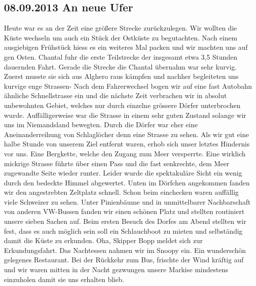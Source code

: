 \subsection{08.09.2013 An neue Ufer} 
Heute war es an der Zeit eine größere Strecke zurückzulegen.
Wir wollten die Küste wechseln um auch ein Stück der Ostküste zu begutachten.
Nach einem ausgiebigen Frühstück hiess es ein weiteres Mal packen und wir machten uns auf gen Osten.
Chantal fuhr die erste Teilstrecke der insgesamt etwa 3,5 Stunden dauernden Fahrt.
Gerade die Strecke die Chantal übernahm war sehr kurvig.
Zuerst musste sie sich aus Alghero raus kämpfen und nachher begleiteten uns kurvige enge Strassen- Nach dem Fahrerwechsel bogen wir auf eine fast Autobahn ähnliche Schnellstrasse ein und die nächste Zeit verbrachen wir in absolut unbewohnten Gebiet, welches nur durch einzelne grössere Dörfer unterbrochen wurde.
Auffälligerweise war die Strasse in einem sehr guten Zustand solange wir uns im Niemandsland bewegten.
Durch die Dörfer war eher eine Aneinanderreihung von Schlaglöcher denn eine Strasse zu sehen.
Als wir gut eine halbe Stunde von unserem Ziel entfernt waren, erhob sich unser letztes Hindernis vor uns.
Eine Bergkette, welche den Zugang zum Meer versperrte.
Eine wirklich mickrige Strasse führte über einen Pass und die fast senkrechte, dem Meer zugewandte Seite wieder runter.
Leider wurde die spektakuläre Sicht ein wenig durch den bedeckte Himmel abgewertet.
Unten im Dörfchen angekommen fanden wir den angestrebten Zeltplatz schnell.
Schon beim einchecken waren auffällig viele Schweizer zu sehen.
Unter Pinienbäume und in unmittelbarer Nachbarschaft von anderen VW-Bussen fanden wir einen schönen Platz und stellten routiniert unsere sieben Sachen auf.
Beim ersten Besuch des Dorfes am Abend stellten wir fest, dass es auch möglich sein soll ein Schlauchboot zu mieten und selbständig damit die Küste zu erkunden.
Oha, Skipper Bopp meldet sich zur Erkundungsfahrt.
Das Nachtessen nahmen wir im Snoopy ein.
Ein wunderschön gelegenes Restaurant.
Bei der Rückkehr zum Bus, frischte der Wind kräftig auf und wir waren mitten in der Nacht gezwungen unsere Markise mindestens einzuholen damit sie uns erhalten blieb.  

